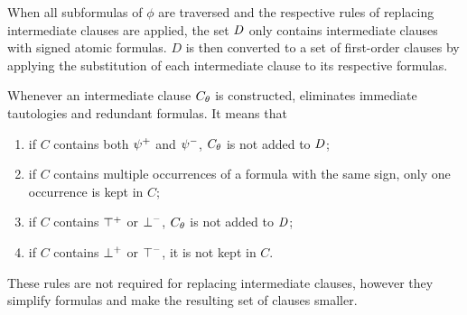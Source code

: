 When all subformulas of $\phi$ are traversed and the respective rules of replacing intermediate clauses are applied, the set $\mathit{D}$ only contains intermediate clauses with signed atomic formulas. $D$ is then converted to a set of first-order clauses by applying the substitution of each intermediate clause to its respective formulas.

Whenever an intermediate clause ${C}_{\theta}$ is constructed, \newcnf{} eliminates immediate tautologies and redundant formulas. It means that
\begin{enumerate}
  \item if $C$ contains both ${\psi}^{+}$ and ${\psi}^{-}$, ${C}_{\theta}$ is not added to $\mathit{D}$;
  \item if $C$ contains multiple occurrences of a formula with the same sign, only one occurrence is kept in $C$;
  \item if $C$ contains ${\top}^{+}$ or ${\bot}^{-}$, ${C}_{\theta}$ is not added to $\mathit{D}$;
  \item if $C$ contains ${\bot}^{+}$ or ${\top}^{-}$, it is not kept in $C$.
\end{enumerate}
These rules are not required for replacing intermediate clauses, however they simplify formulas and make the resulting set of clauses smaller.